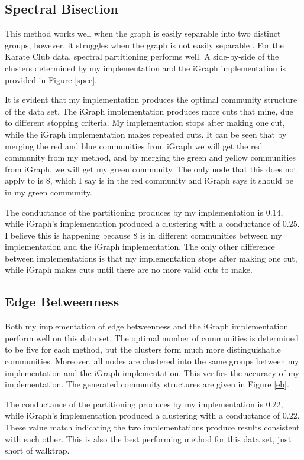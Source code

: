 \documentclass{article}
\begin{document}
    \subsection{Spectral Bisection}
    This method works well when the graph is easily separable into two distinct groups, however, it struggles when the graph is not easily separable \cite{Newman2004}. For the Karate Club data, spectral partitioning performs well. A side-by-side of the clusters determined by my implementation and the iGraph implementation is provided in Figure \ref{spec}.
    \par
    It is evident that my implementation produces the optimal community structure of the data set. The iGraph implementation produces more cuts that mine, due to different stopping criteria. My implementation stops after making one cut, while the iGraph implementation makes repeated cuts. It can be seen that by merging the red and blue communities from iGraph we will get the red community from my method, and by merging the green and yellow communities from iGraph, we will get my green community. The only node that this does not apply to is 8, which I say is in the red community and iGraph says it should be in my green community.
    \par
    The conductance of the partitioning produces by my implementation is $0.14$, while iGraph's implementation produced a clustering with a conductance of $0.25$. I believe this is happening because 8 is in different communities between my implementation and the iGraph implementation. The only other difference between implementations is that my implementation stops after making one cut, while iGraph makes cuts until there are no more valid cuts to make.

    \subsection{Edge Betweenness}
    Both my implementation of edge betweenness and the iGraph implementation perform well on this data set. The optimal number of communities is determined to be five for each method, but the clusters form much more distinguishable communities. Moreover, all nodes are clustered into the same groups between my implementation and the iGraph implementation. This verifies the accuracy of my implementation. The generated community structures are given in Figure \ref{eb}.
    \par
    The conductance of the partitioning produces by my implementation is $0.22$, while iGraph's implementation produced a clustering with a conductance of $0.22$. These value match indicating the two implementations produce results consistent with each other. This is also the best performing method for this data set, just short of walktrap.
\end{document}

